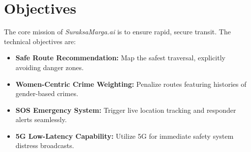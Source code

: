 \section{Objectives}
The core mission of \textit{SuraksaMarga.ai} is to ensure rapid, secure transit. The technical objectives are:
\begin{itemize}
    \item \textbf{Safe Route Recommendation:} Map the safest traversal, explicitly avoiding danger zones.
    \item \textbf{Women-Centric Crime Weighting:} Penalize routes featuring histories of gender-based crimes.
    \item \textbf{SOS Emergency System:} Trigger live location tracking and responder alerts seamlessly.
    \item \textbf{5G Low-Latency Capability:} Utilize 5G for immediate safety system distress broadcasts.
\end{itemize}
